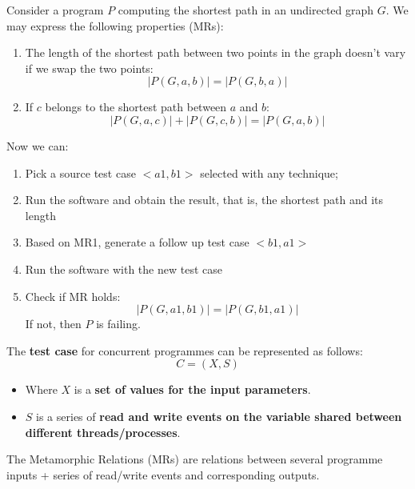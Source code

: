 \begin{examplebox}
    Consider a program $P$ computing the shortest path in an undirected graph $G$. We may express the following properties (MRs):
    \begin{enumerate}[label=\textbf{MR\arabic*}]
        \item The length of the shortest path between two points in the graph doesn't vary if we swap the two points:
        \begin{equation*}
            \left| P\left(G,a,b\right) \right| = \left| P\left(G,b,a\right) \right|
        \end{equation*}

        \item If $c$ belongs to the shortest path between $a$ and $b$:
        \begin{equation*}
            \left| P\left(G,a,c\right) \right| + \left| P\left(G,c,b\right) \right| = \left| P\left(G,a,b\right) \right|
        \end{equation*}
    \end{enumerate}
    Now we can:
    \begin{enumerate}
        \item Pick a source test case $<a1, b1>$ selected with any technique;
        \item Run the software and obtain the result, that is, the shortest path and its length
        \item Based on MR1, generate a follow up test case $<b1, a1>$
        \item Run the software with the new test case
        \item Check if MR holds: 
        \begin{equation*}
            \left| P\left(G,a1,b1\right) \right| = \left| P\left(G,b1,a1\right) \right|
        \end{equation*}
        If not, then $P$ is failing.
    \end{enumerate}
\end{examplebox}

\noindent
The \textbf{test case} for concurrent programmes can be represented as follows:
\begin{equation*}
    C = \left(X, S\right)
\end{equation*}
\begin{itemize}
    \item Where $X$ is a \textbf{set of values for the input parameters}.
    
    \item $S$ is a series of \textbf{read and write events on the variable shared between different threads/processes}.
\end{itemize}
The Metamorphic Relations (MRs) are relations between several programme inputs + series of read/write events and corresponding outputs.

